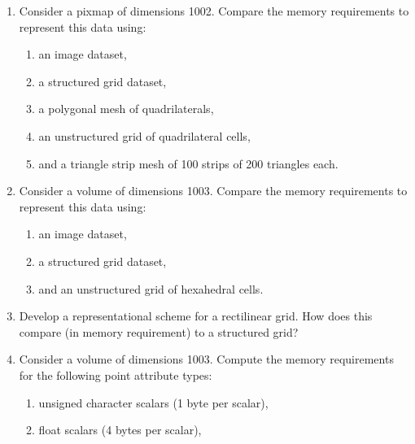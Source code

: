\begin{enumerate}

\item Consider a pixmap of dimensions 1002. Compare the memory requirements to represent this data using:

\begin{enumerate}

	\item an image dataset,

	\item a structured grid dataset,

	\item a polygonal mesh of quadrilaterals,

	\item an unstructured grid of quadrilateral cells,

	\item and a triangle strip mesh of 100 strips of 200 triangles each.

\end{enumerate}

\item Consider a volume of dimensions 1003. Compare the memory requirements to represent this data using:

\begin{enumerate}

	\item an image dataset,

	\item a structured grid dataset,

	\item and an unstructured grid of hexahedral cells.

\end{enumerate}

\item Develop a representational scheme for a rectilinear grid. How does this compare (in memory requirement) to a structured grid?

\item Consider a volume of dimensions 1003. Compute the memory requirements for the following point attribute types:

\begin{enumerate}

	\item unsigned character scalars (1 byte per scalar),

	\item float scalars (4 bytes per scalar),


\end{enumerate}
\end{enumerate}
